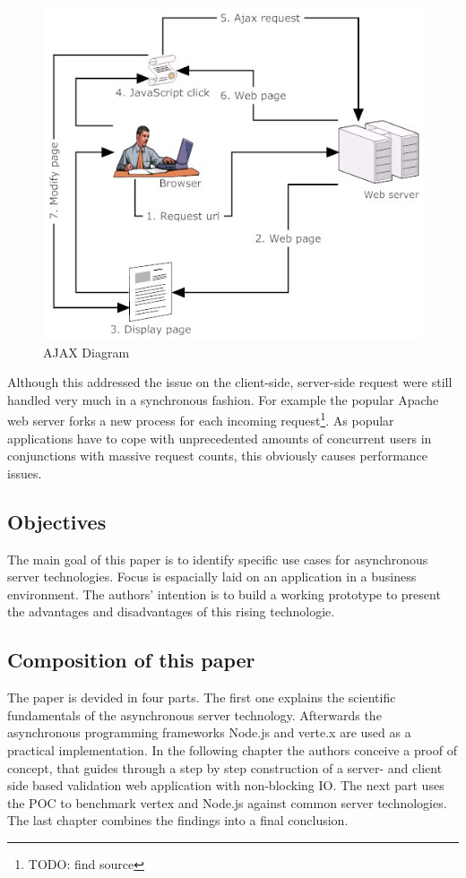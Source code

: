 \begin{figure}[hbtp]
\centering
\includegraphics[scale=0.5]{img/ajax-diagram}
\caption{AJAX Diagram\label{img_ajax}}
\end{figure}

Although this addressed the issue on the client-side, server-side request were
still handled very much in a synchronous fashion. For example the popular Apache
web server forks a new process for each incoming request\footnote{TODO: find
source}. As popular applications have to cope with unprecedented amounts of
concurrent users in conjunctions with massive request counts, this obviously
causes performance issues.\\

\subsection{Objectives}
The main goal of this paper is to identify specific use cases for asynchronous server
technologies. Focus is espacially laid on an application in a business environment. 
The authors' intention is to build a working prototype to present the advantages and
disadvantages of this rising technologie. 

\subsection{Composition of this paper}
The paper is devided in four parts. The first one explains the scientific fundamentals of the asynchronous server
technology. Afterwards the asynchronous programming frameworks Node.js and verte.x are used as a practical implementation.
In the following chapter the authors conceive a proof of concept, that guides through a step by step construction of a
server- and client side based validation web application with non-blocking IO. The next part uses the POC to benchmark vertex and Node.js against 
common server technologies. The last chapter combines the findings into a final conclusion.


